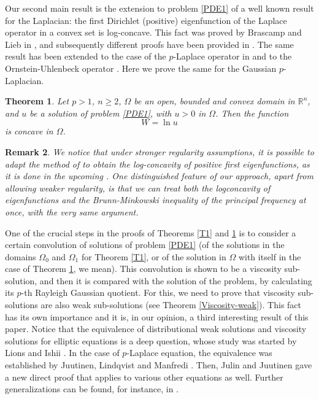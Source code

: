 \documentclass[12pt]{amsart}
\newtheorem{theorem}{Theorem}[section]
\newtheorem{remark}[theorem]{Remark}
\newcommand{\R}{\mathbb R}
\newcommand{\1}{\mathbf 1}
\begin{document}
Our second main result is the extension to problem  \eqref{PDE1} of a well known result for the Laplacian: the first Dirichlet (positive) eigenfunction of the Laplace operator in a convex set is log-concave. This fact was proved by Brascamp and Lieb in \cite{Brascamp-Lieb1976}, and subsequently different proofs have been provided in \cite{Caffarelli-Friedman,Kennington,Korevaar1,Korevaar-Lewis}. The same result has been extended to the case of the $p$-Laplace operator in \cite{Sakaguchi1987} and to the Ornstein-Uhlenbeck operator \cite{Andrea-Paolo2024}. Here we prove the same for the Gaussian $p$-Laplacian.

\begin{theorem}\label{T2}
Let $p>1$, $n\geq 2$, $\Omega $ be an open, bounded and convex domain in $\R^n$, and $u$ be a solution of problem \eqref{PDE1}, with $u>0$ in $\Omega$.
Then the function
\[
W=\ln u
\]
is concave in $\Omega$.
\end{theorem}
\begin{remark}
We notice that under stronger regularity assumptions, it is possible to adapt the method of \cite{Sakaguchi1987} to obtain the log-concavity of positive first eigenfunctions, as it is done in the upcoming \cite{Lei2}. One distinguished feature of our approach, apart from allowing weaker regularity, is that we can treat both the logconcavity of eigenfunctions and the Brunn-Minkowski inequality of the principal frequency at once, with the very same argument.
\end{remark}

One of the crucial steps in the proofs of Theorems \ref{T1} and \ref{T2} is to consider a certain convolution of solutions of problem \eqref{PDE1} (of the solutions in the domains $\Omega_0$ and $\Omega_1$ for Theorem \ref{T1}, or of the solution in $\Omega$ with itself in the case of Theorem \ref{T2}, we mean). This convolution is shown to be a viscosity sub-solution, and then it is compared with the solution of the problem, by calculating its $p$-th Rayleigh Gaussian quotient.
For this, we need to prove that viscosity sub-solutions are also weak sub-solutions (see Theorem \ref{Viscosity-weak}). This fact has its own importance and it is, in our opinion, a third interesting result of this paper. Notice that the equivalence of distributional weak solutions and viscosity solutions for elliptic equations is a deep question, whose study was started by Lions \cite{Lions} and Ishii \cite{Ishii}. In the case of $p$-Laplace equation, the equivalence was established by Juutinen, Lindqvist and Manfredi \cite{Juutinen2001}. Then, Julin and Juutinen \cite{Versa-Julin2012} gave a new direct proof that applies to various other equations as well. Further generalizations can be found, for instance, in \cite{Radulescu2024, MO, Siltakoski2018}.
\smallskip
\end{document}
